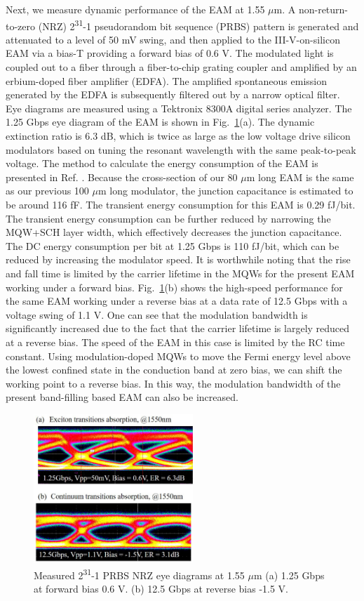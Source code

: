 \documentclass[aip,apl,reprint,a4paper]{revtex4-1}
\def\SP#1{\textsuperscript{#1}}
\begin{document}
Next, we measure dynamic performance of the EAM at 1.55 $\mu$m. A non-return-to-zero (NRZ)  2\SP{31}-1 pseudorandom bit sequence (PRBS) pattern is generated and  attenuated  to  a  level  of  50 mV  swing,  and then  applied  to  the III-V-on-silicon EAM via a bias-T providing a forward bias of 0.6 V. The modulated light is coupled out to a fiber through a fiber-to-chip grating coupler and amplified by an erbium-doped fiber amplifier (EDFA). The amplified spontaneous emission generated by the EDFA is subsequently filtered out by a narrow optical filter. Eye diagrams are measured using a Tektronix 8300A digital series analyzer. The 1.25 Gbps eye diagram of the EAM is shown in Fig.~\ref{fig:6}(a). The dynamic extinction ratio is 6.3 dB, which is twice as large as the low voltage drive silicon modulators based on tuning the resonant wavelength with the same peak-to-peak voltage.\cite{Shakoor:14} The method to calculate the energy consumption of the EAM is presented in Ref. . Because the cross-section of our 80 $\mu$m long EAM is the same as our previous 100 $\mu$m long modulator,\cite{fu52015} the junction capacitance is estimated to be around 116 fF. The transient energy consumption for this EAM is 0.29 fJ/bit. The transient energy consumption can be further reduced by narrowing the MQW+SCH layer width, which effectively decreases the junction capacitance. The DC energy consumption per bit at 1.25 Gbps is 110 fJ/bit, which can be reduced by increasing the modulator speed. It is worthwhile noting that the rise and fall time is limited by the carrier lifetime in the MQWs for the present EAM working under a forward bias. Fig.~\ref{fig:6}(b) shows the high-speed performance for the same EAM working under a reverse bias at a data rate of 12.5 Gbps with a voltage swing of 1.1 V. One can see that the modulation bandwidth is significantly increased due to the fact that the carrier lifetime is largely reduced at a reverse bias. The speed of the EAM in this case is limited by the RC time constant.\cite{Yong40,fu52015} Using modulation-doped MQWs to move the Fermi energy level above the lowest confined state in the conduction band at zero bias, we can shift the working point to a reverse bias.\cite{livescu1988free,kalinovsky1993free} In this way, the modulation bandwidth of the present band-filling based EAM can also be increased.

\begin{figure}
	\includegraphics[width=6cm]{figure/fig6.eps}%
	\caption{\label{fig:6} Measured 2\SP{31}-1 PRBS NRZ eye diagrams at 1.55 $\mu$m (a) 1.25 Gbps at forward bias 0.6 V.  (b) 12.5 Gbps at reverse bias -1.5 V.}
\end{figure}
\end{document}
